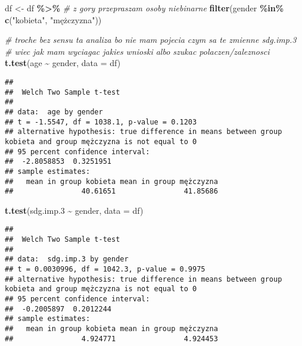 \documentclass[
]{article}
\newenvironment{Shaded}{\begin{snugshade}}{\end{snugshade}}
\newcommand{\AttributeTok}[1]{\textcolor[rgb]{0.13,0.29,0.53}{#1}}
\newcommand{\CommentTok}[1]{\textcolor[rgb]{0.56,0.35,0.01}{\textit{#1}}}
\newcommand{\FloatTok}[1]{\textcolor[rgb]{0.00,0.00,0.81}{#1}}
\newcommand{\FunctionTok}[1]{\textcolor[rgb]{0.13,0.29,0.53}{\textbf{#1}}}
\newcommand{\NormalTok}[1]{#1}
\newcommand{\OtherTok}[1]{\textcolor[rgb]{0.56,0.35,0.01}{#1}}
\newcommand{\SpecialCharTok}[1]{\textcolor[rgb]{0.81,0.36,0.00}{\textbf{#1}}}
\newcommand{\StringTok}[1]{\textcolor[rgb]{0.31,0.60,0.02}{#1}}
\begin{document}
\begin{Shaded}
\begin{Highlighting}[]
\NormalTok{df }\OtherTok{\textless{}{-}}\NormalTok{ df }\SpecialCharTok{\%\textgreater{}\%} 
  \CommentTok{\# z gory przepraszam osoby niebinarne}
  \FunctionTok{filter}\NormalTok{(gender }\SpecialCharTok{\%in\%} \FunctionTok{c}\NormalTok{(}\StringTok{"kobieta"}\NormalTok{, }\StringTok{"mężczyzna"}\NormalTok{))}
\end{Highlighting}
\end{Shaded}

\begin{Shaded}
\begin{Highlighting}[]
\CommentTok{\# troche bez sensu ta analiza bo nie mam pojecia czym sa te zmienne sdg.imp.3}
\CommentTok{\# wiec jak mam wyciagac jakies wnioski albo szukac polaczen/zaleznosci}
\FunctionTok{t.test}\NormalTok{(age }\SpecialCharTok{\textasciitilde{}}\NormalTok{ gender, }\AttributeTok{data =}\NormalTok{ df)}
\end{Highlighting}
\end{Shaded}

\begin{verbatim}
## 
##  Welch Two Sample t-test
## 
## data:  age by gender
## t = -1.5547, df = 1038.1, p-value = 0.1203
## alternative hypothesis: true difference in means between group kobieta and group mężczyzna is not equal to 0
## 95 percent confidence interval:
##  -2.8058853  0.3251951
## sample estimates:
##   mean in group kobieta mean in group mężczyzna 
##                40.61651                41.85686
\end{verbatim}

\begin{Shaded}
\begin{Highlighting}[]
\FunctionTok{t.test}\NormalTok{(sdg.imp}\FloatTok{.3} \SpecialCharTok{\textasciitilde{}}\NormalTok{ gender, }\AttributeTok{data =}\NormalTok{ df)}
\end{Highlighting}
\end{Shaded}

\begin{verbatim}
## 
##  Welch Two Sample t-test
## 
## data:  sdg.imp.3 by gender
## t = 0.0030996, df = 1042.3, p-value = 0.9975
## alternative hypothesis: true difference in means between group kobieta and group mężczyzna is not equal to 0
## 95 percent confidence interval:
##  -0.2005897  0.2012244
## sample estimates:
##   mean in group kobieta mean in group mężczyzna 
##                4.924771                4.924453
\end{verbatim}
\end{document}
